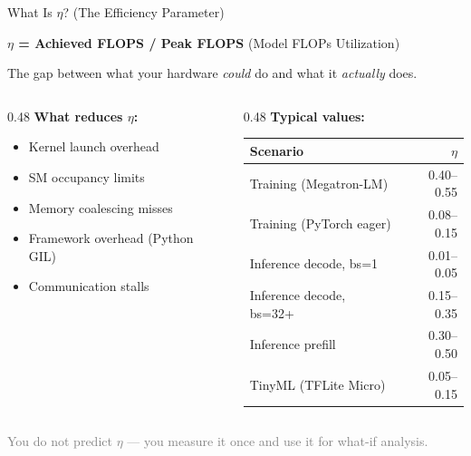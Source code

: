\documentclass[aspectratio=169, 12pt]{beamer}
\begin{document}
\begin{frame}[shrink]{What Is $\eta$? (The Efficiency Parameter)}

\small
\textbf{$\eta$ = Achieved FLOPS / Peak FLOPS} (Model FLOPs Utilization)

\vspace{0.3cm}
The gap between what your hardware \emph{could} do and what it \emph{actually} does.

\vspace{0.3cm}
\begin{columns}[T]
\begin{column}{0.48\textwidth}
\textbf{What reduces $\eta$:}
\begin{itemize}\setlength\itemsep{1pt}
\item Kernel launch overhead
\item SM occupancy limits
\item Memory coalescing misses
\item Framework overhead (Python GIL)
\item Communication stalls
\end{itemize}
\end{column}
\begin{column}{0.48\textwidth}
\textbf{Typical values:}

\scriptsize
\begin{tabular}{@{}lr@{}}
\toprule
Scenario & $\eta$ \\
\midrule
Training (Megatron-LM) & 0.40--0.55 \\
Training (PyTorch eager) & 0.08--0.15 \\
Inference decode, bs=1 & 0.01--0.05 \\
Inference decode, bs=32+ & 0.15--0.35 \\
Inference prefill & 0.30--0.50 \\
TinyML (TFLite Micro) & 0.05--0.15 \\
\bottomrule
\end{tabular}
\end{column}
\end{columns}

\vfill
\centering
\small\textcolor{gray}{You do not predict $\eta$ --- you measure it once and use it for what-if analysis.}
\end{frame}
\end{document}
